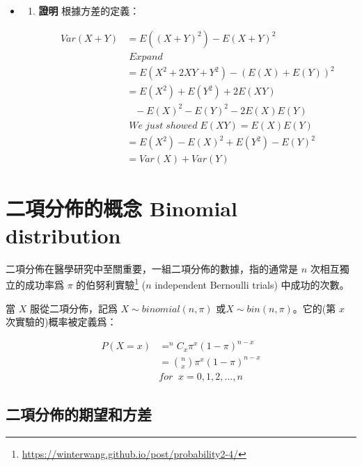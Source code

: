 \documentclass[]{ctexbook}
\providecommand{\tightlist}{%
  \setlength{\itemsep}{0pt}\setlength{\parskip}{0pt}}
\renewcommand{\href}[2]{#2\footnote{\url{#1}}}
\begin{document}
\begin{itemize}
\item
  \begin{enumerate}
  \def\labelenumi{\alph{enumi})}
  \setcounter{enumi}{1}
  \tightlist
  \item
    \textbf{證明} 根據方差的定義：

    \begin{align}
    Var(X+Y) &= E((X+Y)^2)-E(X+Y)^2 \\
     & \; Expand \\
     &=E(X^2+2XY+Y^2)-(E(X)+E(Y))^2\\
     &=E(X^2)+E(Y^2)+2E(XY)\\
     &\;\;\; - E(X)^2-E(Y)^2-2E(X)E(Y)\\
     &\; We\;just\;showed\; E(XY)=E(X)E(Y)\\
     &=E(X^2)-E(X)^2+E(Y^2)-E(Y)^2 \\
     &=Var(X)+Var(Y)
    \end{align}
  \end{enumerate}
\end{itemize}

\chapter{二項分佈的概念 Binomial
distribution}\label{-binomial-distribution}

二項分佈在醫學研究中至關重要，一組二項分佈的數據，指的通常是 \(n\)
次相互獨立的\href{https://winterwang.github.io/post/probability2-4/}{成功率爲
\(\pi\) 的伯努利實驗} (\(n\) independent Bernoulli trials)
中成功的次數。

當 \(X\) 服從二項分佈，記爲 \(X \sim binomial(n, \pi)\)
或\(X \sim bin(n, \pi)\)。它的(第 \(x\) 次實驗的)概率被定義爲：

\begin{align}
P(X=x) &= ^nC_x\pi^x(1-\pi)^{n-x} \\
       &= \binom{n}{x}\pi^x(1-\pi)^{n-x} \\
       & for\;\; x = 0,1,2,\dots,n
\end{align}

\section{二項分佈的期望和方差}
\end{document}
